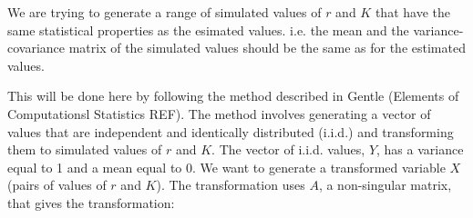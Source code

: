 \documentclass[a4paper]{article}
\begin{document}
%


We are trying to generate a range of simulated values of $r$ and $K$ that have the same statistical properties as
the esimated values. i.e. the mean and the variance-covariance matrix of the simulated values should be the same as for the estimated values.

This will be done here by following the method described in Gentle (Elements of Computationsl Statistics REF). 
The method involves generating a vector of values that are independent and identically distributed (i.i.d.) and transforming them to simulated values of $r$ and $K$.
The vector of i.i.d. values, $Y$, has a variance equal to 1 and a mean equal to 0.  
We want to generate a transformed variable $X$ (pairs of values of $r$ and $K$). The transformation uses $A$, a non-singular matrix, that gives the transformation:
\end{document}
